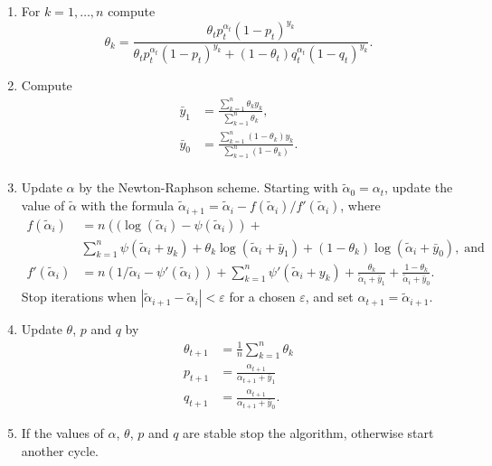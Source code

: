\documentclass[12pt]{article}
\begin{document}
    \begin{enumerate}

      \item For $k = 1, \ldots , n$ compute
        \begin{equation*}
        \theta_k = \frac{\theta_t p_t^{\alpha_t}(1-p_t)^{y_k}}
        {\theta_t p_t^{\alpha_t}(1-p_t)^{y_k} + (1-\theta_t)
         q_t^{\alpha_t}(1-q_t)^{y_k}}.
        \end{equation*}

      \item Compute
        \begin{align*}
        \bar{y}_1 &= \frac{\sum_{k=1}^n \theta_k y_k}
          {\sum_{k=1}^n \theta_k}, \\
        \bar{y}_0 &= \frac{\sum_{k=1}^n (1-\theta_k) y_k}
          {\sum_{k=1}^n (1-\theta_k)}. \\
        \end{align*}

      \item Update $\alpha$ by the Newton-Raphson scheme. Starting
        with $\tilde{\alpha}_{0} = \alpha_t$,
        update the value of $\tilde{\alpha}$
        with the formula
        $\tilde{\alpha}_{i+1} = \tilde{\alpha}_i -
        f(\tilde{\alpha}_i)/f'(\tilde{\alpha}_i)$, where
        \begin{align*}
          f(\tilde{\alpha}_i) &= n \left( (\log(\tilde{\alpha}_i) -
          \psi(\tilde{\alpha}_i) \right) + \\
          &\sum_{k=1}^n \psi(\tilde{\alpha}_i+y_k) +
          \theta_k \log(\tilde{\alpha}_i + \bar{y}_1)
          + (1-\theta_k) \log(\tilde{\alpha}_i + \bar{y}_0),
          \; \text{and} \\
          f'(\tilde{\alpha}_i) &= n \left( 1/\tilde{\alpha}_i -
          \psi'(\tilde{\alpha}_i) \right) +
          \sum_{k=1}^n \psi'(\tilde{\alpha}_i+y_k) +
          \frac{\theta_k}{\tilde{\alpha}_i+\bar{y}_1} +
          \frac{1-\theta_k}{\tilde{\alpha}_i + \bar{y}_0}.
        \end{align*}
        Stop iterations when
        $|\tilde{\alpha}_{i+1} - \tilde{\alpha}_i| < \varepsilon$ for
        a chosen $\varepsilon$, and set $\alpha_{t+1} =
        \tilde{\alpha}_{i+1}$.

      \item Update $\theta$, $p$ and $q$ by
        \begin{align*}
        \theta_{t+1} &= \frac{1}{n}\sum_{k=1}^n\theta_k \\
        p_{t+1} &= \frac{\alpha_{t+1}} {\alpha_{t+1}+\bar{y}_1} \\
        q_{t+1} &= \frac{\alpha_{t+1}} {\alpha_{t+1}+\bar{y}_0}.
        \end{align*}

      \item If the values of $\alpha$, $\theta$, $p$ and $q$ are
      stable stop the algorithm, otherwise start another cycle.
    \end{enumerate}
\end{document}
